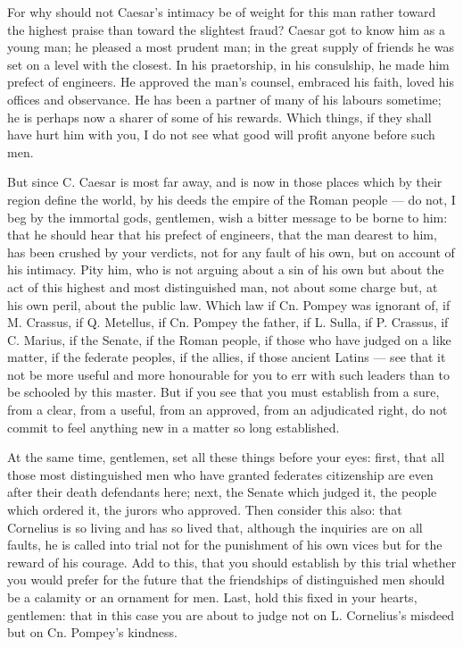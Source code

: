  For why should not Caesar's intimacy be of weight for this man rather toward the highest praise than toward the slightest fraud? Caesar got to know him as a young man; he pleased a most prudent man; in the great supply of friends he was set on a level with the closest. In his praetorship, in his consulship, he made him prefect of engineers. He approved the man's counsel, embraced his faith, loved his offices and observance. He has been a partner of many of his labours sometime; he is perhaps now a sharer of some of his rewards. Which things, if they shall have hurt him with you, I do not see what good will profit anyone before such men.

 But since C. Caesar is most far away, and is now in those places which by their region define the world, by his deeds the empire of the Roman people --- do not, I beg by the immortal gods, gentlemen, wish a bitter message to be borne to him: that he should hear that his prefect of engineers, that the man dearest to him, has been crushed by your verdicts, not for any fault of his own, but on account of his intimacy. Pity him, who is not arguing about a sin of his own but about the act of this highest and most distinguished man, not about some charge but, at his own peril, about the public law. Which law if Cn. Pompey was ignorant of, if M. Crassus, if Q. Metellus, if Cn. Pompey the father, if L. Sulla, if P. Crassus, if C. Marius, if the Senate, if the Roman people, if those who have judged on a like matter, if the federate peoples, if the allies, if those ancient Latins --- see that it not be more useful and more honourable for you to err with such leaders than to be schooled by this master. But if you see that you must establish from a sure, from a clear, from a useful, from an approved, from an adjudicated right, do not commit to feel anything new in a matter so long established.

 At the same time, gentlemen, set all these things before your eyes: first, that all those most distinguished men who have granted federates citizenship are even after their death defendants here; next, the Senate which judged it, the people which ordered it, the jurors who approved. Then consider this also: that Cornelius is so living and has so lived that, although the inquiries are on all faults, he is called into trial not for the punishment of his own vices but for the reward of his courage. Add to this, that you should establish by this trial whether you would prefer for the future that the friendships of distinguished men should be a calamity or an ornament for men. Last, hold this fixed in your hearts, gentlemen: that in this case you are about to judge not on L. Cornelius's misdeed but on Cn. Pompey's kindness.
